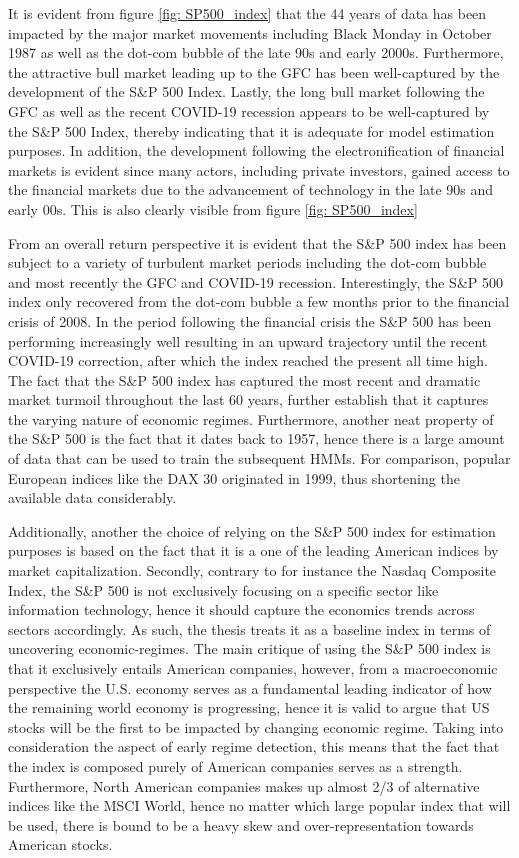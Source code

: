 It is evident from figure \ref{fig: SP500_index} that the 44 years of data has been impacted by the major market movements including Black Monday in October 1987 as well as the dot-com bubble of the late 90s and early 2000s. Furthermore, the attractive bull market leading up to the GFC has been well-captured by the development of the S\&P 500 Index. Lastly, the long bull market following the GFC as well as the recent COVID-19 recession appears to be well-captured by the S\&P 500 Index, thereby indicating that it is adequate for model estimation purposes. In addition, the development following the electronification of financial markets is evident since many actors, including private investors, gained access to the financial markets due to the advancement of technology in the late 90s and early 00s. This is also clearly visible from figure \ref{fig: SP500_index}


From an overall return perspective it is evident that the S\&P 500 index has been subject to a variety of turbulent market periods including the dot-com bubble and most recently the GFC and COVID-19 recession. Interestingly, the S\&P 500 index only recovered from the dot-com bubble a few months prior to the financial crisis of 2008. In the period following the financial crisis the S\&P 500 has been performing increasingly well resulting in an upward trajectory until the recent COVID-19 correction, after which the index reached the present all time high. The fact that the S\&P 500 index has captured the most recent and dramatic market turmoil throughout the last 60 years, further establish that it captures the varying nature of economic regimes. Furthermore, another neat property of the S\&P 500 is the fact that it dates back to 1957, hence there is a large amount of data that can be used to train the subsequent HMMs. For comparison, popular European indices like the DAX 30 originated in 1999, thus shortening the available data considerably.

Additionally, another the choice of relying on the S\&P 500 index for estimation purposes is based on the fact that it is a one of the leading American indices by market capitalization. Secondly, contrary to for instance the Nasdaq Composite Index, the S\&P 500 is not exclusively focusing on a specific sector like information technology, hence it should capture the economics trends across sectors accordingly. As such, the thesis treats it as a baseline index in terms of uncovering economic-regimes. The main critique of using the S\&P 500 index is that it exclusively entails American companies, however, from a macroeconomic perspective the U.S. economy serves as a fundamental leading indicator of how the remaining world economy is progressing, hence it is valid to argue that US stocks will be the first to be impacted by changing economic regime. Taking into consideration the aspect of early regime detection, this means that the fact that the index is composed purely of American companies serves as a strength. Furthermore, North American companies makes up almost 2/3 of alternative indices like the MSCI World, hence no matter which large popular index that will be used, there is bound to be a heavy skew and over-representation towards American stocks.


